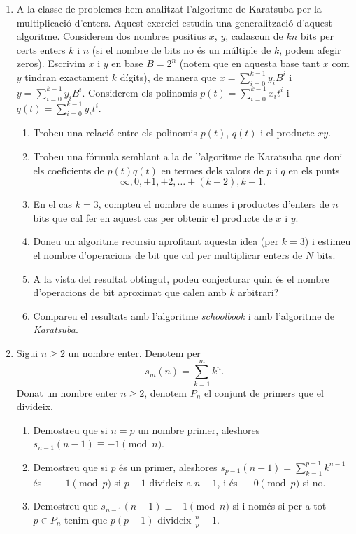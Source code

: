 \begin{enumerate}[leftmargin=*]
\item  A la classe de problemes hem analitzat l'algoritme de
Karatsuba per la multiplicació d'enters. Aquest exercici estudia una
generalització d'aquest algoritme. Considerem dos nombres positius
$x$, $y$, cadascun de $kn$ bits per certs enters $k$ i $n$ (si el
nombre de bits no és un múltiple de $k$, podem afegir zeros).
Escrivim $x$ i $y$ en base $B = 2^n$ (notem que en aquesta base tant
$x$ com $y$ tindran exactament $k$ dígits), de manera que
$x=\sum_{i=0}^{k-1} y_i B^i$ i $y=\sum_{i=0}^{k-1} y_iB^i$.
Considerem els polinomis $p(t)=\sum_{i=0}^{k-1}x_it^i$ i
$q(t)=\sum_{i=0}^{k-1}y_it^i$.
  \begin{enumerate}
  \item Trobeu una relació entre els polinomis $p(t)$, $q(t)$ i el producte $xy$.
  \item Trobeu una fórmula semblant a la de l'algoritme de Karatsuba que doni els coeficients de $p(t)q(t)$ en termes dels valors de $p$ i $q$ en els punts
    \[
      \infty, 0, \pm 1, \pm 2,\ldots \pm (k-2), k-1.
    \]
  \item En el cas $k=3$, compteu el nombre de sumes i productes d'enters de $n$ bits que cal fer en aquest cas per obtenir el producte de $x$ i $y$.
  \item Doneu un algoritme recursiu aprofitant aquesta idea (per $k=3$) i estimeu el nombre d'operacions de bit que cal per multiplicar enters de $N$ bits.
  \item A la vista del resultat obtingut, podeu conjecturar quin és el nombre d'operacions de bit aproximat que calen amb $k$ arbitrari?
  \item Compareu el resultats amb l'algoritme \emph{schoolbook} i amb l'algoritme de \emph{Karatsuba}.
  \end{enumerate}

\item  Sigui $n\ge 2$ un nombre enter. Denotem per
$$s_m(n)=\sum_{k=1}^{m} k^{n}.$$ Donat un nombre enter
$n\ge 2$, denotem $P_n$ el conjunt de primers que el divideix.
\begin{enumerate}
\item Demostreu que si $n=p$ un nombre primer, aleshores $s_{n-1}(n-1)\equiv
-1 \pmod{n}$.
\item Demostreu que si $p$ és un primer, aleshores $s_{p-1}(n-1)=\sum_{k=1}^{p-1}
k^{n-1}$ és $\equiv -1\pmod{p}$ si $p-1$ divideix a $n-1$, i és
$\equiv 0\pmod{p}$ si no.
\item Demostreu que $s_{n-1}(n-1)\equiv -1 \pmod{n}$ si i només si per a tot
$p\in P_n$ tenim que $p(p-1)$ divideix $\frac np -1$. 


\end{enumerate}
\end{enumerate}
